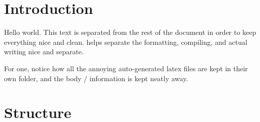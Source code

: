 \section{Introduction}

Hello world. This text is separated from the rest of the document in order to keep everything nice and clean. helps separate the formatting, compiling, and actual writing nice and separate. 

For one, notice how all the annoying auto-generated latex files are kept in their own folder, and the body / information is kept neatly away. 

\section{Structure}
